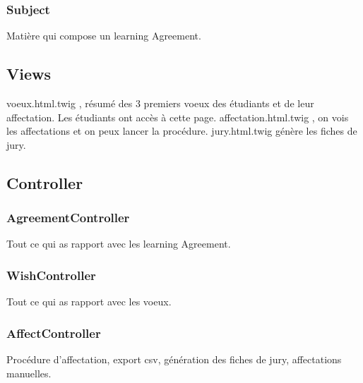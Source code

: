 \subsubsection{Subject}
Matière qui compose un learning Agreement.

\subsection{Views}
voeux.html.twig , résumé des 3 premiers voeux des étudiants et de leur affectation. Les étudiants ont accès à cette page.
affectation.html.twig , on vois les affectations et on peux lancer la procédure.
jury.html.twig génère les fiches de jury.

\subsection{Controller}
\subsubsection{AgreementController}
Tout ce qui as rapport avec les learning Agreement.

\subsubsection{WishController}
Tout ce qui as rapport avec les voeux.

\subsubsection{AffectController}
Procédure d'affectation, export csv, génération des fiches de jury, affectations manuelles.

